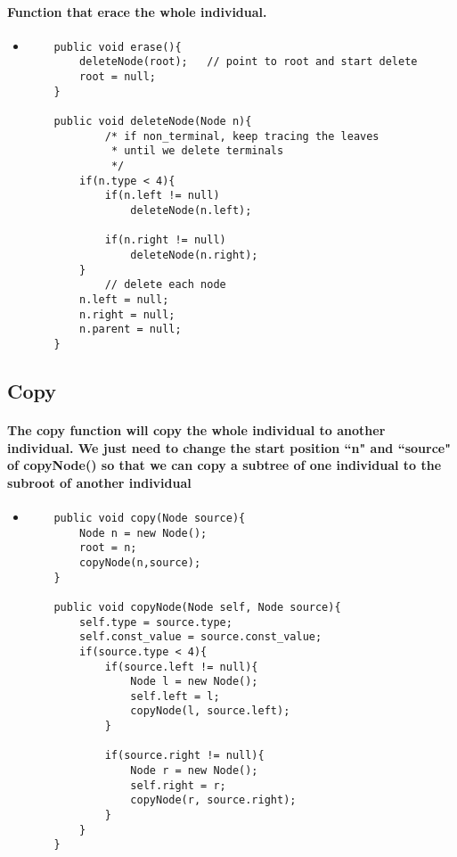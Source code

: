 \documentclass[12pt]{article}
\begin{document}
	\paragraph{Function that erace the whole individual.}
	\begin{itemize}
	\item 
	\begin{lstlisting}
    public void erase(){
        deleteNode(root);   // point to root and start delete
        root = null;
    }
    
    public void deleteNode(Node n){
            /* if non_terminal, keep tracing the leaves
             * until we delete terminals
             */
        if(n.type < 4){
            if(n.left != null)
                deleteNode(n.left);
            
            if(n.right != null)
                deleteNode(n.right);
        }
            // delete each node
        n.left = null; 
        n.right = null;
        n.parent = null;
    }
	\end{lstlisting}
	\end{itemize}
	
	\subsection{Copy}
	\paragraph{The copy function will copy the whole individual to another individual. We just need to change the start position ``n" and ``source" of copyNode() so that we can copy a subtree of one individual to the subroot of another individual}
	\begin{itemize}
	\item 
	\begin{lstlisting}
    public void copy(Node source){
        Node n = new Node();
        root = n;
        copyNode(n,source);
    }
    
    public void copyNode(Node self, Node source){        
        self.type = source.type;
        self.const_value = source.const_value;
        if(source.type < 4){
            if(source.left != null){
                Node l = new Node();
                self.left = l;
                copyNode(l, source.left);
            }
            
            if(source.right != null){
                Node r = new Node();
                self.right = r;
                copyNode(r, source.right);
            }
        }
    }
	\end{lstlisting}
	\end{itemize}
	
\end{document}
